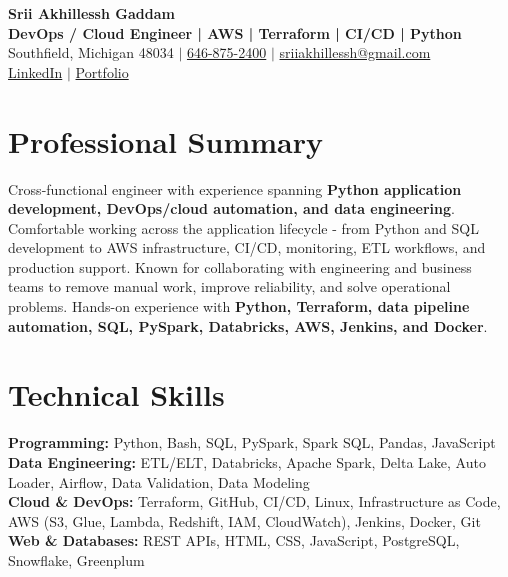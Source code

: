 \documentclass[letterpaper,10pt]{article}
\begin{document}
\fontsize{9.35pt}{10.45pt}\selectfont

\begin{center}
    {\LARGE \textbf{Srii Akhillessh Gaddam}} \\[-1pt]
    \textbf{DevOps / Cloud Engineer | AWS | Terraform | CI/CD | Python} \\[2pt]
    Southfield, Michigan 48034 $|$
    \href{tel:6468752400}{646-875-2400} $|$
    \href{mailto:sriiakhillessh@gmail.com}{sriiakhillessh@gmail.com} \\[1pt]
    \href{https://www.linkedin.com/in/srii-akhiilessh-gaddam-b48668191/}{LinkedIn} $|$
    \href{https://sriiakhillesshg.github.io/portfolio/}{Portfolio}
\end{center}
\vspace{-8pt}

\section{Professional Summary}
\small{Cross-functional engineer with experience spanning \textbf{Python application development, DevOps/cloud automation, and data engineering}. Comfortable working across the application lifecycle - from Python and SQL development to AWS infrastructure, CI/CD, monitoring, ETL workflows, and production support. Known for collaborating with engineering and business teams to remove manual work, improve reliability, and solve operational problems. Hands-on experience with \textbf{Python, Terraform, data pipeline automation, SQL, PySpark, Databricks, AWS, Jenkins, and Docker}.}

\section{Technical Skills}
\small{
\textbf{Programming:} Python, Bash, SQL, PySpark, Spark SQL, Pandas, JavaScript \\
\textbf{Data Engineering:} ETL/ELT, Databricks, Apache Spark, Delta Lake, Auto Loader, Airflow, Data Validation, Data Modeling \\
\textbf{Cloud \& DevOps:} Terraform, GitHub, CI/CD, Linux, Infrastructure as Code, AWS (S3, Glue, Lambda, Redshift, IAM, CloudWatch), Jenkins, Docker, Git \\
\textbf{Web \& Databases:} REST APIs, HTML, CSS, JavaScript, PostgreSQL, Snowflake, Greenplum
}
\end{document}
